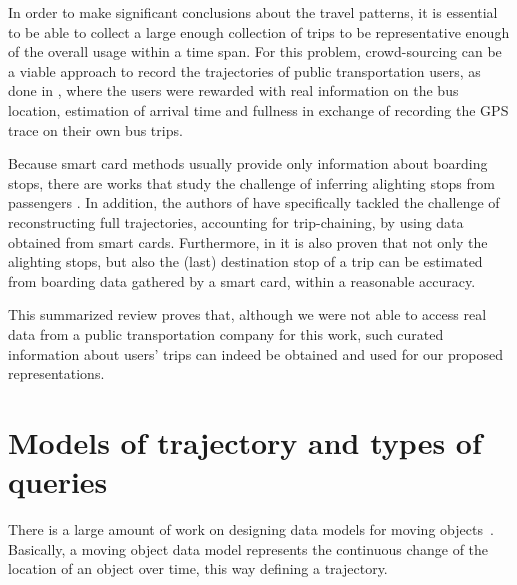 \documentclass[a4paper,10pt,twoside]{book}
\begin{document}
	In order to make significant conclusions about the travel patterns, it is essential to be able to collect a large enough collection of trips to be representative enough of the overall usage within a time span. For this problem, crowd-sourcing can be a viable approach to record the trajectories of public transportation users, as done in \cite{zimmerman2011field}, where the users were rewarded with real information on the bus location, estimation of arrival time and fullness in exchange of recording the GPS trace on their own bus trips.

    Because smart card methods usually provide only information about boarding stops, there are works that study the challenge of inferring alighting stops from passengers \cite{wang2011review}. In addition, the authors of \cite{tao2014exploring} have specifically tackled the challenge of reconstructing full trajectories, accounting for trip-chaining, by using data obtained from smart cards. Furthermore, in \cite{alsger2016validating} it is also proven that not only the alighting stops, but also the (last) destination stop of a trip can be estimated from boarding data gathered by a smart card, within a reasonable accuracy.
    
    This summarized review proves that, although we were not able to access real data from a public transportation company for this work, such curated information about users' trips can indeed be obtained and used for our proposed representations.
	
	\section{Models of trajectory and types of queries}
    There is a large amount of work on designing data models for moving objects~\cite{DBLP:conf/ssdbm/WolfsonXCJ98,DBLP:conf/icde/SistlaWCD97,DBLP:journals/tods/GutingBEJLSV00,DBLP:conf/chorochronos/GutingBEJLNSV03,DBLP:journals/geoinformatica/Spaccapietra01,DBLP:conf/sigmod/ForlizziGNS00,DBLP:journals/geoinformatica/ErwigGSV99,DBLP:books/mk/GutingS2005}. Basically, a moving object data model represents the continuous change of the location of an object over time, this way defining a trajectory.
    
\end{document}
